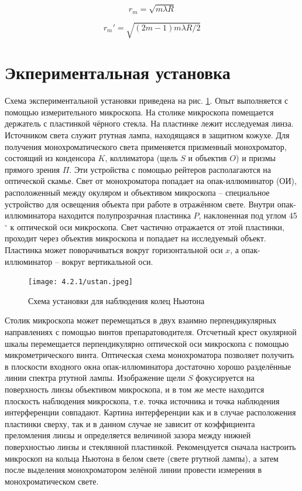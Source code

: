 \documentclass[a4paper,12pt]{article} %
\begin{document}
\begin{equation}
    r_m = \sqrt{m\lambda R}
    \label{dark}
\end{equation}

\begin{equation}
    r_m' = \sqrt{(2m-1)m\lambda R/2}
    \label{light}
\end{equation}

\section{Экпериментальная установка}

Схема экспериментальной установки приведена на рис. \ref{ust}. Опыт выполняется с помощью измерительного микроскопа. На столике микроскопа помещается держатель с пластинкой чёрного стекла. На пластинке лежит исследуемая линза.
Источником света служит ртутная лампа, находящаяся в защитном кожухе. Для получения монохроматического света применяется призменный монохроматор, состоящий из конденсора $K$, коллиматора (щель $S$ и объектив $O$) и призмы прямого зрения $\Pi$. Эти устройства с помощью рейтеров располагаются на оптической скамье. Свет от монохроматора попадает на опак-иллюминатор (ОИ), расположенный между окуляром и объективом микроскопа -- специальное устройство для освещения объекта при работе в отражённом свете. Внутри опак-иллюминатора находится полупрозрачная пластинка $P$, наклоненная под углом 45$^\circ$ к оптической оси микроскопа. Свет частично отражается от этой пластинки, проходит через объектив микроскопа и попадает на исследуемый объект. Пластинка может поворачиваться вокруг горизонтальной оси $x$, а опак-иллюминатор -- вокруг вертикальной оси.

\begin{figure}[H]
    \centering
    \texttt{[image: 4.2.1/ustan.jpeg]}
    \caption{Схема установки для наблюдения колец Ньютона}
    \label{ust}
\end{figure}

Столик микроскопа может перемещаться в двух взаимно перпендикулярных направлениях с помощью винтов препаратоводителя. Отсчетный крест окулярной шкалы перемещается перпендикулярно оптической оси микроскопа с помощью микрометрического винта.
Оптическая схема монохроматора позволяет получить в плоскости входного окна опак-иллюминатора достаточно хорошо разделённые линии спектра ртутной лампы. Изображение щели $S$ фокусируется на поверхность линзы объективом микроскопа, и в том же месте находится плоскость наблюдения микроскопа, т.е. точка источника и точка наблюдения интерференции совпадают. Картина интерференции как и в случае расположения пластинки сверху, так и в данном случае не зависит от коэффициента преломления линзы и определяется величиной зазора между нижней поверхностью линзы и стеклянной пластинкой.
Рекомендуется сначала настроить микроскоп на кольца Ньютона в белом свете (свете ртутной лампы), а затем после выделения монохроматором зелёной линии провести измерения в монохроматическом свете.
\end{document}
